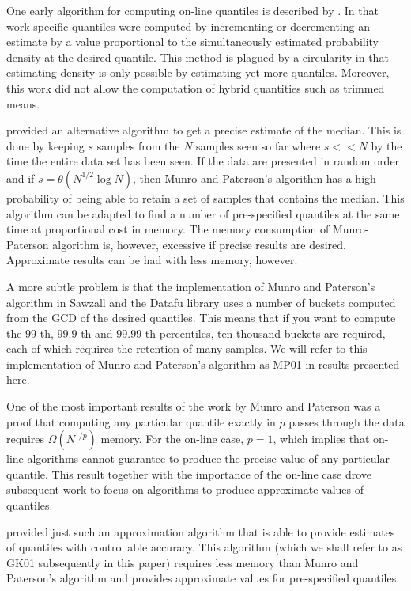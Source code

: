 \documentclass[]{statsoc}
\begin{document}
One early algorithm for computing on-line quantiles is described by \citet{Chen2000}.  In that work specific quantiles were computed by incrementing or decrementing an estimate by a value proportional to the simultaneously estimated probability density at the desired quantile.  This method is plagued by a circularity in that estimating density is only possible by estimating yet more quantiles.  Moreover, this work did not allow the computation of hybrid quantities such as trimmed means.

\citet{munro1980} provided an alternative algorithm to get a precise estimate of the median.  This is done by keeping $s$ samples from the $N$ samples seen so far where $s << N$ by the time the entire data set has been seen.  If the data are presented in random order and if $s = \theta(N^{1/2} \log N)$, then Munro and Paterson's algorithm has a high probability of being able to retain a set of samples that contains the median.  This algorithm can be adapted to find a number of pre-specified quantiles at the same time at proportional cost in memory.  The memory consumption of Munro-Paterson algorithm is, however, excessive if precise results are desired.  Approximate results can be had with less memory, however.  

A more subtle problem is that the implementation of Munro and Paterson's algorithm in Sawzall\citep{sawzall} and the Datafu library\citep{datafu} uses a number of buckets computed from the GCD of the desired quantiles.  This means that if you want to compute the $99$-th, $99.9$-th and $99.99$-th percentiles, ten thousand buckets are required, each of which requires the retention of many samples. We will refer to this implementation of Munro and Paterson's algorithm as MP01 in results presented here.

One of the most important results of the work by Munro and Paterson was a proof that computing any particular quantile exactly in $p$ passes through the data requires $\Omega(N^{1/p})$ memory. For the on-line case, $p=1$, which implies that on-line algorithms cannot guarantee to produce the precise value of any particular quantile. This result together with the importance of the on-line case drove subsequent work to focus on algorithms to produce approximate values of quantiles.

\citet{Greenwald-space-efficient-online-quantiles} provided just such an approximation algorithm that is able to provide estimates of quantiles with controllable accuracy. This algorithm (which we shall refer to as GK01 subsequently in this paper) requires less memory than Munro and Paterson's algorithm and provides approximate values for pre-specified quantiles.
\end{document}
